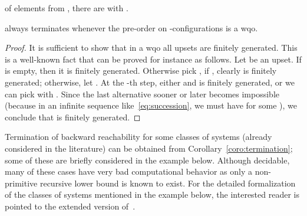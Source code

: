 \documentclass{LMCS}
\theoremstyle{plain}\newtheorem{assumption}[thm]{Assumption}
\theoremstyle{plain}\newtheorem{proposition}[thm]{Proposition}
\theoremstyle{plain}\newtheorem{property}[thm]{Property}
\theoremstyle{plain}\newtheorem{example}[thm]{Example}
\theoremstyle{plain}\newtheorem{claim}[thm]{Claim}
\theoremstyle{plain}\newtheorem{lemma}[thm]{Lemma}
\begin{document}
of elements from , there are  with .
\begin{cor}
  \label{coro:termination}
   always terminates whenever the pre-order on
  -configurations is a wqo.
\end{cor}
\begin{proof}
  It is sufficient to show that in a wqo all upsets are finitely
  generated.  This is a well-known fact that can be proved for
  instance as follows.  Let  be an upset.  If  is empty, then it
  is finitely generated.  Otherwise pick , if , clearly  is finitely generated; otherwise, let . At the -th step, either  and  is finitely generated, or
  we can pick  with . Since the last alternative
  sooner or later becomes impossible (because in an infinite sequence
  like~\eqref{eq:succession}, we must have  for some ), we conclude that  is finitely
  generated.
\end{proof}
Termination of backward reachability for some classes of systems
(already considered in the literature) can be obtained from
Corollary~\ref{coro:termination}; some of these are briefly considered
in the example below.  Although decidable, many of these cases have
very bad computational behavior as only a non-primitive recursive
lower bound is known to exist.  For the detailed formalization of the
classes of systems mentioned in the example below, the interested
reader is pointed to the extended version of~\cite{ijcar08}.
\end{document}
